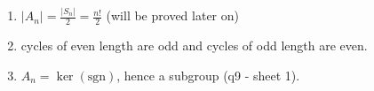 \begin{remark} \mbox{}
  \begin{enumerate}
  \def\labelenumi{\roman{enumi}.}
  \item
    \(|A_n| = \frac{|S_n|}{2} = \frac{n!}{2}\) (will be proved later on)
  \item
    cycles of even length are odd and cycles of odd length are even.
  \item
    \(A_n = \ker (\text{sgn})\), hence a subgroup (q9 - sheet 1).
  \end{enumerate}
\end{remark}